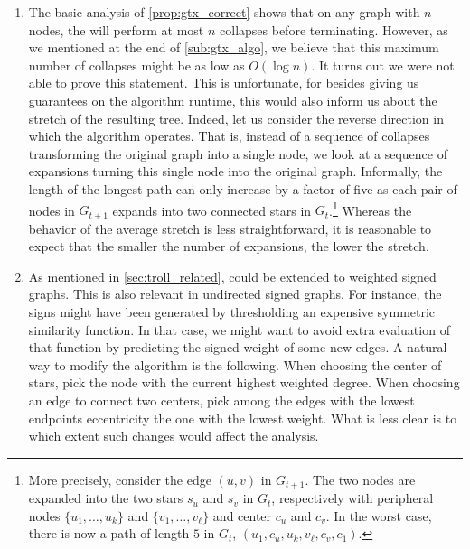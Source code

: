 \begin{enumerate}[1)]

	\item The basic analysis of \autoref{prop:gtx_correct} shows that on any graph with $n$ nodes, the
		\gtx{} will perform at most $n$ collapses before terminating. However, as we mentioned
		 at the end of \autoref{sub:gtx_algo}, we believe that this
		maximum number of collapses might be as low as $O(\log n)$. It turns out we were not able to
		prove this statement. This is unfortunate, for besides giving us guarantees on the algorithm
		runtime, this would also inform us about the stretch of the resulting tree. Indeed, let us
		consider the reverse direction in which the \gtx{} algorithm operates. That is, instead of a
		sequence of collapses transforming the original graph into a single node, we look at a sequence
		of expansions turning this single node into the original graph. Informally, the length of the
		longest path can only increase by a factor of five as each pair of nodes in $G_{t+1}$ expands
		into two connected stars in $G_{t}$.\footnote{More precisely, consider the edge $(u,v)$ in
		$G_{t+1}$. The two nodes are expanded into the two stars $s_u$ and $s_v$ in $G_t$, respectively
		with peripheral nodes $\{u_1, \ldots, u_k\}$ and $\{v_1, \ldots, v_\ell\}$ and center $c_u$ and
		$c_v$. In the worst case, there is now a path of length $5$ in $G_t$, \eg{} $(u_1, c_u, u_k,
		v_\ell, c_v, c_1)$.} Whereas the behavior of the average stretch is less straightforward, it is
		reasonable to expect that the smaller the number of expansions, the lower the stretch.

	\item As mentioned in \autoref{sec:troll_related}, \esp{} could be extended to weighted signed
		graphs. This is also relevant in undirected signed graphs. For instance, the signs might have
		been generated by thresholding an expensive symmetric similarity function. In that case, we
		might want to avoid extra evaluation of that function by predicting the signed weight of some
		new edges. A natural way to modify the \gtx{} algorithm is the following. When choosing the
		center of stars, pick the node with the current highest weighted degree. When choosing an edge
		to connect two centers, pick among the edges with the lowest endpoints eccentricity the one with
		the lowest weight. What is less clear is to which extent such changes would affect the analysis.


\end{enumerate}

